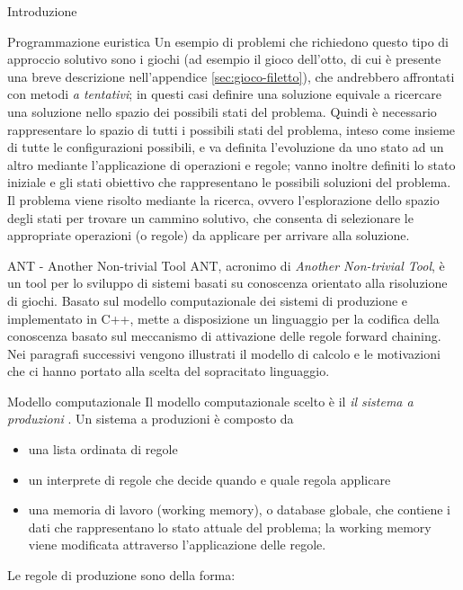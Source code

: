 \begin{chapter}{Introduzione}
\begin{section}{Programmazione euristica}
Un esempio di problemi che richiedono questo tipo di approccio solutivo sono i giochi
(ad esempio il gioco dell'otto, di cui \`e presente una breve descrizione nell'appendice
\ref{sec:gioco-filetto}), che andrebbero affrontati con metodi \textit{a tentativi};
in questi casi definire una soluzione equivale a ricercare una soluzione nello spazio
dei possibili stati del problema. Quindi \`e necessario rappresentare lo spazio di tutti i
possibili stati del problema, inteso come insieme di tutte le configurazioni possibili,
e va definita l'evoluzione da uno stato ad un altro mediante l'applicazione di operazioni
e regole; vanno inoltre definiti lo stato iniziale e gli stati obiettivo che rappresentano
le possibili soluzioni del problema. Il problema viene risolto mediante la ricerca, ovvero
l'esplorazione dello spazio degli stati per trovare un cammino solutivo, che consenta di
selezionare le appropriate operazioni (o regole) da applicare per arrivare alla soluzione.
\end{section}

\begin{section}{ANT - Another Non-trivial Tool}
ANT, acronimo di \textit{Another Non-trivial Tool}, \`e un tool per lo sviluppo di sistemi basati su conoscenza 
orientato alla risoluzione di giochi. Basato sul modello computazionale dei sistemi di produzione e implementato in C++,
mette a disposizione un linguaggio per la codifica della conoscenza basato sul meccanismo di attivazione delle regole
forward chaining. Nei paragrafi successivi vengono illustrati il modello di calcolo e le motivazioni che ci hanno
portato alla scelta del sopracitato linguaggio.
\end{section}
 
\begin{section}{Modello computazionale}
Il modello computazionale scelto \`e il \textit{il sistema a produzioni} \cite{Jackson99}. Un sistema a
produzioni \`e composto da
\begin{itemize}
    \item una lista ordinata di regole
    \item un interprete di regole che decide quando e quale regola applicare
    \item una memoria di lavoro (working memory), o database globale, che contiene i dati
    che rappresentano lo stato attuale del problema; la working memory viene modificata
    attraverso l'applicazione delle regole.
\end{itemize}

\noindent Le regole di produzione sono della forma:


\end{section}
\end{chapter}
